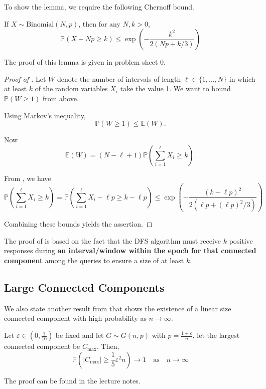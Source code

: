\documentclass{article}
\begin{document}
To show the lemma, we require the following Chernoff bound.  

\begin{lemma}\label{lem:chernoff}
    If $X\sim \text{Binomial}(N,p)$, then for any $N, k >0$,
    \begin{equation*}
        \mathbb{P}(X-N p\geq k)\leq \exp\left(-{\frac{k^{2}}{2(N p+k/3)}}\right)
    \end{equation*}
\end{lemma}

The proof of this lemma is given in problem sheet 0.  

\begin{proof}[Proof of ]
    Let $W$ denote the number of intervals of length $\ell \in \{1, \ldots, N\}$ in which at least $k$ of the random variables $X_i$ take the value 1. We want to bound $\mathbb{P}(W \geq 1)$ from above.

    Using Markov's inequality,
    \[
    \mathbb{P}(W \geq 1) \leq \mathbb{E}(W).
    \]
    
    Now
    \[
    \mathbb{E}(W) = (N - \ell + 1)\mathbb{P}\left(\sum_{i=1}^{\ell} X_i \geq k \right).
    \]
    
    From , we have
    \[
    \mathbb{P}\left(\sum_{i=1}^{\ell} X_i \geq k\right) = \mathbb{P}\left(\sum_{i=1}^{\ell} X_i - \ell p \geq k - \ell p\right) \leq \exp \left(-\frac{(k-\ell p)^2}{2(\ell p+(\ell p)^2/3)}\right)
    \]
    
    Combining these bounds yields the assertion.
\end{proof}


\begin{remark}
    The proof of  is based on the fact that the DFS algorithm must receive $k$ positive responses during \textbf{an interval/window within the epoch for that connected component} among the queries to ensure a size of at least $k$.
\end{remark}


\subsection{Large Connected Components}

We also state another result from \citep{krivelevich2012phase} that shows the existence of a linear size connected component with high probability as $n\to \infty$.  

\begin{theorem}
    Let $\varepsilon \in (0,\frac{1}{10})$ be fixed and let $G\sim G(n,p)$ with $p=\frac{1+\varepsilon}{n}$, let the largest connected component be $C_{\max}$. Then,
    \begin{equation*}
        \mathbb{P}(|C_{\max}|\geq \frac{1}{5}\varepsilon^2 n)\to 1 \quad \text{as} \quad n\to \infty
    \end{equation*}
\end{theorem}

The proof can be found in the lecture notes.



\end{document}

